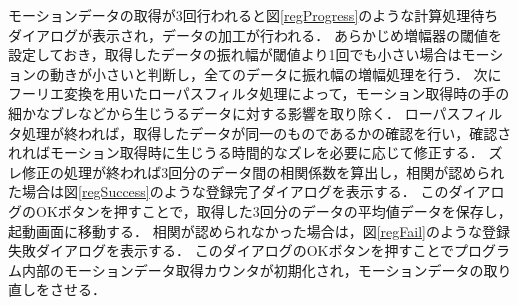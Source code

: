 \documentclass[11pt]{jreport}
\begin{document}
        モーションデータの取得が3回行われると図\ref{regProgress}のような計算処理待ちダイアログが表示され，データの加工が行われる．
        あらかじめ増幅器の閾値を設定しておき，取得したデータの振れ幅が閾値より1回でも小さい場合はモーションの動きが小さいと判断し，全てのデータに振れ幅の増幅処理を行う．
        次にフーリエ変換を用いたローパスフィルタ処理によって，モーション取得時の手の細かなブレなどから生じうるデータに対する影響を取り除く．
        ローパスフィルタ処理が終われば，取得したデータが同一のものであるかの確認を行い，確認されればモーション取得時に生じうる時間的なズレを必要に応じて修正する．
        ズレ修正の処理が終われば3回分のデータ間の相関係数を算出し，相関が認められた場合は図\ref{regSuccess}のような登録完了ダイアログを表示する．
        このダイアログのOKボタンを押すことで，取得した3回分のデータの平均値データを保存し，起動画面に移動する．
        相関が認められなかった場合は，図\ref{regFail}のような登録失敗ダイアログを表示する．
        このダイアログのOKボタンを押すことでプログラム内部のモーションデータ取得カウンタが初期化され，モーションデータの取り直しをさせる．
\end{document}
